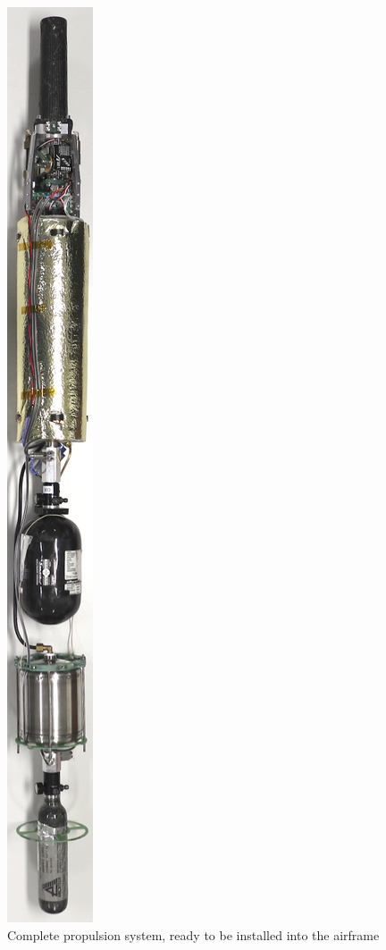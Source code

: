 \begin{figure}[H]
\centering
\includegraphics[width=\textwidth]{Propulsion/propSystem.png}
\caption{Complete propulsion system, ready to be installed into the airframe}
\label{fig:sysarch_prop_propSystem}
\end{figure}

